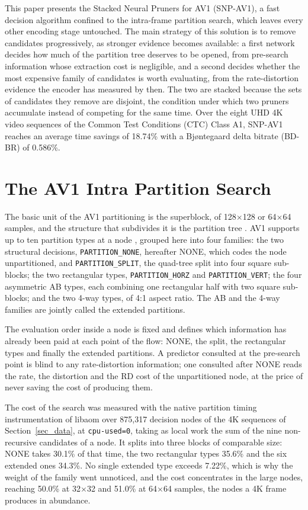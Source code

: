 \documentclass[conference]{IEEEtran}
\begin{document}
This paper presents the Stacked Neural Pruners for AV1 (SNP-AV1), a fast decision
algorithm confined to the intra-frame partition search, which leaves every other
encoding stage untouched. The main strategy of this solution is to remove
candidates progressively, as stronger evidence becomes available: a first network
decides how much of the partition tree deserves to be opened, from pre-search
information whose extraction cost is negligible, and a second decides whether the
most expensive family of candidates is worth evaluating, from the
rate-distortion evidence the encoder has measured by then. The two are stacked
because the sets of candidates they remove are disjoint, the condition under
which two pruners accumulate instead of competing for the same time. Over the
eight UHD 4K video sequences of the Common Test Conditions (CTC) Class A1,
SNP-AV1 reaches an average time savings of 18.74\% with a Bj{\o}ntegaard delta
bitrate (BD-BR) of 0.586\%.

\section{The AV1 Intra Partition Search}
\label{sec_shapes}

The basic unit of the AV1 partitioning is the superblock, of 128$\times$128 or
64$\times$64 samples, and the structure that subdivides it is the partition tree
\cite{han2021}. AV1 supports up to ten partition types at a node \cite{chen2018},
grouped here into four families: the two structural decisions,
\texttt{PARTITION\_NONE}, hereafter NONE, which codes the node unpartitioned, and
\texttt{PARTITION\_SPLIT}, the quad-tree split into four square sub-blocks; the two
rectangular types, \texttt{PARTITION\_HORZ} and \texttt{PARTITION\_VERT}; the four
asymmetric AB types, each combining one rectangular half with two square
sub-blocks; and the two 4-way types, of 4:1 aspect ratio. The AB and the 4-way
families are jointly called the extended partitions.

The evaluation order inside a node is fixed and defines which information has
already been paid at each point of the flow: NONE, the split, the rectangular
types and finally the extended partitions. A predictor consulted at the
pre-search point is blind to any rate-distortion information; one consulted after
NONE reads the rate, the distortion and the RD cost of the unpartitioned node, at
the price of never saving the cost of producing them.

The cost of the search was measured with the native partition timing
instrumentation of libaom over 875{,}317 decision nodes of the 4K sequences of
Section~\ref{sec_data}, at \texttt{cpu-used=0}, taking as local work the sum of
the nine non-recursive candidates of a node. It splits into three blocks of
comparable size: NONE takes 30.1\% of that time, the two rectangular types 35.6\%
and the six extended ones 34.3\%. No single extended type exceeds 7.22\%, which is
why the weight of the family went unnoticed, and the cost concentrates in the
large nodes, reaching 50.0\% at 32$\times$32 and 51.0\% at 64$\times$64 samples,
the nodes a 4K frame produces in abundance.
\end{document}
